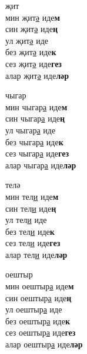 \begin{multicols}{4}
\begin{enumerate}
\begin{minipage}{\linewidth}
    \item
    җит\\
    мин җит\underline{ә} иде\textbf{м}\\
    син җит\underline{ә} иде\textbf{ң}\\
    ул җит\underline{ә} иде\\
    без җит\underline{ә} иде\textbf{к}\\
    сез җит\underline{ә} иде\textbf{гез}\\
    алар җит\underline{ә} иде\textbf{ләр}\\
\end{minipage}

\begin{minipage}{\linewidth}
    \item
    чыгар\\
    мин чыгар\underline{а} иде\textbf{м}\\
    син чыгар\underline{а} иде\textbf{ң}\\
    ул чыгар\underline{а} иде\\
    без чыгар\underline{а} иде\textbf{к}\\
    сез чыгар\underline{а} иде\textbf{гез}\\
    алар чыгар\underline{а} иде\textbf{ләр}\\
\end{minipage}

\begin{minipage}{\linewidth}
    \item
    телә\\
    мин тел\underline{и} иде\textbf{м}\\
    син тел\underline{и} иде\textbf{ң}\\
    ул тел\underline{и} иде\\
    без тел\underline{и} иде\textbf{к}\\
    сез тел\underline{и} иде\textbf{гез}\\
    алар тел\underline{и} иде\textbf{ләр}\\
\end{minipage}

\begin{minipage}{\linewidth}
    \item
    оештыр\\
    мин оештыр\underline{а} иде\textbf{м}\\
    син оештыр\underline{а} иде\textbf{ң}\\
    ул оештыр\underline{а} иде\\
    без оештыр\underline{а} иде\textbf{к}\\
    сез оештыр\underline{а} иде\textbf{гез}\\
    алар оештыр\underline{а} иде\textbf{ләр}\\
\end{minipage}


\end{enumerate}
\end{multicols}
